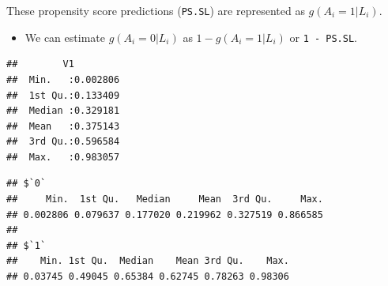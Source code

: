 \documentclass[
]{book}
\newenvironment{Shaded}{\begin{snugshade}}{\end{snugshade}}
\newcommand{\AttributeTok}[1]{\textcolor[rgb]{0.77,0.63,0.00}{#1}}
\newcommand{\FunctionTok}[1]{\textcolor[rgb]{0.00,0.00,0.00}{#1}}
\newcommand{\NormalTok}[1]{#1}
\newcommand{\OtherTok}[1]{\textcolor[rgb]{0.56,0.35,0.01}{#1}}
\newcommand{\SpecialCharTok}[1]{\textcolor[rgb]{0.00,0.00,0.00}{#1}}
\newcommand{\StringTok}[1]{\textcolor[rgb]{0.31,0.60,0.02}{#1}}
\providecommand{\tightlist}{%
  \setlength{\itemsep}{0pt}\setlength{\parskip}{0pt}}
\begin{document}
\begin{Shaded}
\end{Shaded}

\begin{rmdcomment}
These propensity score predictions (\texttt{PS.SL}) are represented as
\(g(A_i=1|L_i)\).
\end{rmdcomment}

\begin{itemize}
\tightlist
\item
  We can estimate \(g(A_i=0|L_i)\) as \(1 - g(A_i=1|L_i)\) or \texttt{1\ -\ PS.SL}.
\end{itemize}

\begin{Shaded}
\end{Shaded}

\begin{verbatim}
##        V1          
##  Min.   :0.002806  
##  1st Qu.:0.133409  
##  Median :0.329181  
##  Mean   :0.375143  
##  3rd Qu.:0.596584  
##  Max.   :0.983057
\end{verbatim}

\begin{Shaded}
\end{Shaded}

\begin{verbatim}
## $`0`
##     Min.  1st Qu.   Median     Mean  3rd Qu.     Max. 
## 0.002806 0.079637 0.177020 0.219962 0.327519 0.866585 
## 
## $`1`
##    Min. 1st Qu.  Median    Mean 3rd Qu.    Max. 
## 0.03745 0.49045 0.65384 0.62745 0.78263 0.98306
\end{verbatim}
\end{document}

